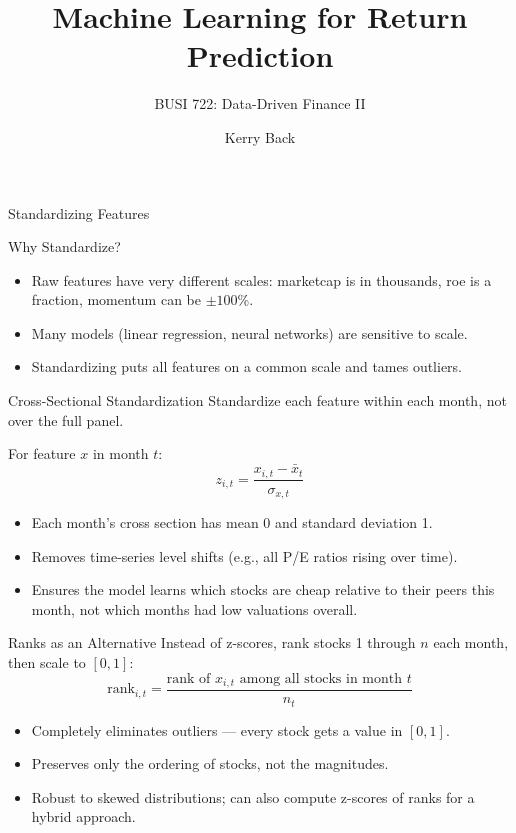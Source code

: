 \documentclass[aspectratio=169,t]{beamer}
\title{Machine Learning for Return Prediction}
\subtitle{BUSI 722: Data-Driven Finance II}
\author{Kerry Back}
\institute{}
\date{}
\begin{document}
\maketitle


\begin{frame}[c]
\centering
\Huge Standardizing Features
\end{frame}

\begin{frame}{Why Standardize?}
\begin{itemize}
\item Raw features have very different scales: marketcap is in thousands, roe is a fraction, momentum can be $\pm 100\%$.
\item Many models (linear regression, neural networks) are sensitive to scale.
\item Standardizing puts all features on a common scale and tames outliers.
\end{itemize}
\end{frame}

\begin{frame}{Cross-Sectional Standardization}
Standardize each feature \alert{within each month}, not over the full panel.
\vspace{0.3cm}

For feature $x$ in month $t$:
\[
z_{i,t} = \frac{x_{i,t} - \bar x_t}{\sigma_{x,t}}
\]

\begin{itemize}
\item Each month's cross section has mean 0 and standard deviation 1.
\item Removes time-series level shifts (e.g., all P/E ratios rising over time).
\item Ensures the model learns \alert{which stocks are cheap relative to their peers this month}, not which months had low valuations overall.
\end{itemize}
\end{frame}

\begin{frame}{Ranks as an Alternative}
Instead of z-scores, rank stocks 1 through $n$ each month, then scale to $[0, 1]$:
\[
\text{rank}_{i,t} = \frac{\text{rank of } x_{i,t} \text{ among all stocks in month } t}{n_t}
\]

\begin{itemize}
\item Completely eliminates outliers --- every stock gets a value in $[0,1]$.
\item Preserves only the \alert{ordering} of stocks, not the magnitudes.
\item Robust to skewed distributions; can also compute z-scores of ranks for a hybrid approach.
\end{itemize}
\end{frame}
\end{document}
